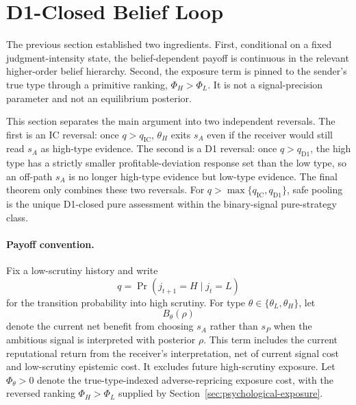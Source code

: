 
\section{D1-Closed Belief Loop}
\label{sec:belief-loop}

The previous section established two ingredients. First, conditional on a fixed judgment-intensity state, the belief-dependent payoff is continuous in the relevant higher-order belief hierarchy. Second, the exposure term is pinned to the sender's true type through a primitive ranking, \(\Phi_H>\Phi_L\). It is not a signal-precision parameter and not an equilibrium posterior.

This section separates the main argument into two independent reversals. The first is an IC reversal: once \(q>q_{\mathrm{IC}}\), \(\theta_H\) exits \(s_A\) even if the receiver would still read \(s_A\) as high-type evidence. The second is a D1 reversal: once \(q>q_{\mathrm{D1}}\), the high type has a strictly smaller profitable-deviation response set than the low type, so an off-path \(s_A\) is no longer high-type evidence but low-type evidence. The final theorem only combines these two reversals. For \(q>\max\{q_{\mathrm{IC}},q_{\mathrm{D1}}\}\), safe pooling is the unique D1-closed pure assessment within the binary-signal pure-strategy class.

\paragraph{Payoff convention.}
Fix a low-scrutiny history and write
\[
q=\Pr(j_{t+1}=H\mid j_t=L)
\]
for the transition probability into high scrutiny. For type \(\theta\in\{\theta_L,\theta_H\}\), let
\[
B_\theta(\rho)
\]
denote the current net benefit from choosing \(s_A\) rather than \(s_P\) when the ambitious signal is interpreted with posterior \(\rho\). This term includes the current reputational return from the receiver's interpretation, net of current signal cost and low-scrutiny epistemic cost. It excludes future high-scrutiny exposure. Let \(\Phi_\theta>0\) denote the true-type-indexed adverse-repricing exposure cost, with the reversed ranking \(\Phi_H>\Phi_L\) supplied by Section~\ref{sec:psychological-exposure}.

